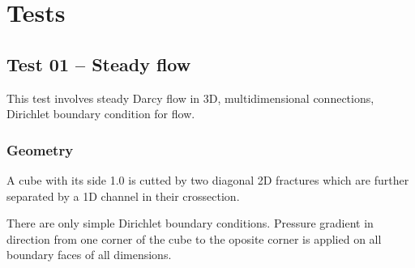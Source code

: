 %
%
%
%

\chapter{Tests}

\section{Test 01 -- Steady flow}
This test involves steady Darcy flow in 3D, multidimensional connections, Dirichlet boundary condition for flow.

\subsection*{Geometry}
A cube with its side 1.0 is cutted by two diagonal 2D fractures which are further separated by a 1D channel in their crossection.

There are only simple Dirichlet boundary conditions. Pressure gradient in direction from one corner of the cube to the oposite corner is applied on all boundary faces of all dimensions.

